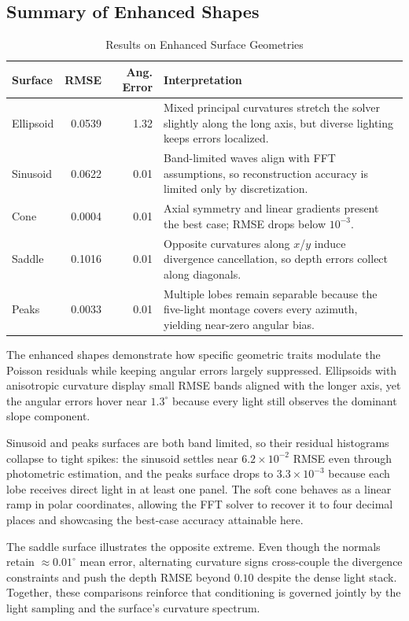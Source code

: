\documentclass[11pt]{article}
\begin{document}
\subsection{Summary of Enhanced Shapes}

\begin{table}[H]
\centering
\caption{Results on Enhanced Surface Geometries}
\begin{tabularx}{\textwidth}{|l|r|r|>{\raggedright\arraybackslash}X|}
\hline
\textbf{Surface} & \textbf{RMSE} & \textbf{Ang. Error} & \textbf{Interpretation} \\
\hline
Ellipsoid & 0.0539 & 1.32 & Mixed principal curvatures stretch the solver slightly along the long axis, but diverse lighting keeps errors localized. \\
Sinusoid & 0.0622 & 0.01 & Band-limited waves align with FFT assumptions, so reconstruction accuracy is limited only by discretization. \\
Cone & 0.0004 & 0.01 & Axial symmetry and linear gradients present the best case; RMSE drops below $10^{-3}$. \\
Saddle & 0.1016 & 0.01 & Opposite curvatures along $x$/$y$ induce divergence cancellation, so depth errors collect along diagonals. \\
Peaks & 0.0033 & 0.01 & Multiple lobes remain separable because the five-light montage covers every azimuth, yielding near-zero angular bias. \\
\hline
\end{tabularx}
\end{table}

The enhanced shapes demonstrate how specific geometric traits modulate the Poisson residuals while keeping angular errors largely suppressed. Ellipsoids with anisotropic curvature display small RMSE bands aligned with the longer axis, yet the angular errors hover near $1.3^{\circ}$ because every light still observes the dominant slope component.

Sinusoid and peaks surfaces are both band limited, so their residual histograms collapse to tight spikes: the sinusoid settles near $6.2\times10^{-2}$ RMSE even through photometric estimation, and the peaks surface drops to $3.3\times10^{-3}$ because each lobe receives direct light in at least one panel. The soft cone behaves as a linear ramp in polar coordinates, allowing the FFT solver to recover it to four decimal places and showcasing the best-case accuracy attainable here.

The saddle surface illustrates the opposite extreme. Even though the normals retain $\approx0.01^{\circ}$ mean error, alternating curvature signs cross-couple the divergence constraints and push the depth RMSE beyond $0.10$ despite the dense light stack. Together, these comparisons reinforce that conditioning is governed jointly by the light sampling and the surface’s curvature spectrum.
\end{document}
